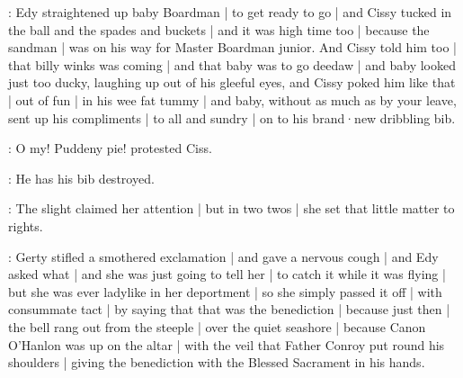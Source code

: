 :
Edy straightened up baby Boardman |
to get ready to go |
and Cissy tucked in
the ball and the spades and buckets |
and it was high time too |
because the sandman |
was on his way for Master Boardman junior.
And Cissy told him too |
that billy winks was coming |
and that baby was to go deedaw |
and baby looked just too ducky,
laughing up out of his gleeful eyes,
and Cissy poked him like that |%
out of fun |
in his wee fat tummy |
and baby,
without as much as by your leave,
sent up his compliments |
to all and sundry |
on to his brand·new dribbling bib.

\cissy:
O my!
Puddeny pie!
protested Ciss.

\cissy:
He has his bib destroyed.

:
The slight 
claimed her attention |
but in two twos |
she set that little matter to rights.

:
Gerty stifled a smothered exclamation |
and gave a nervous cough |
and Edy asked what |
and she was just going to tell her |
to catch it while it was flying |
but she was ever ladylike in her deportment |
so she simply passed it off |
with consummate tact |
by saying that that was the benediction |
because just then |
the bell rang out from the steeple |%
over the quiet seashore |
because Canon O'Hanlon
was up on the altar |
with the veil
that Father Conroy put round his shoulders |
giving the benediction
with the Blessed Sacrament in his hands.

